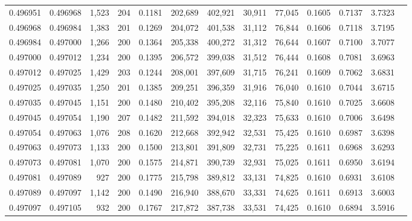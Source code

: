\begin{tabular}{rrrrrrrrrrrrr}
0.496951 & 0.496968 & 1,523 & 204 &                                     0.1181 & 202,689 & 402,921 &  30,911 &  77,045 & 0.1605 & 0.7137 & 3.7323 \\
0.496968 & 0.496984 & 1,383 & 201 &                                     0.1269 & 204,072 & 401,538 &  31,112 &  76,844 & 0.1606 & 0.7118 & 3.7195 \\
0.496984 & 0.497000 & 1,266 & 200 &                                     0.1364 & 205,338 & 400,272 &  31,312 &  76,644 & 0.1607 & 0.7100 & 3.7077 \\
0.497000 & 0.497012 & 1,234 & 200 &                                     0.1395 & 206,572 & 399,038 &  31,512 &  76,444 & 0.1608 & 0.7081 & 3.6963 \\
0.497012 & 0.497025 & 1,429 & 203 &                                     0.1244 & 208,001 & 397,609 &  31,715 &  76,241 & 0.1609 & 0.7062 & 3.6831 \\
0.497025 & 0.497035 & 1,250 & 201 &                                     0.1385 & 209,251 & 396,359 &  31,916 &  76,040 & 0.1610 & 0.7044 & 3.6715 \\
0.497035 & 0.497045 & 1,151 & 200 &                                     0.1480 & 210,402 & 395,208 &  32,116 &  75,840 & 0.1610 & 0.7025 & 3.6608 \\
0.497045 & 0.497054 & 1,190 & 207 &                                     0.1482 & 211,592 & 394,018 &  32,323 &  75,633 & 0.1610 & 0.7006 & 3.6498 \\
0.497054 & 0.497063 & 1,076 & 208 &                                     0.1620 & 212,668 & 392,942 &  32,531 &  75,425 & 0.1610 & 0.6987 & 3.6398 \\
0.497063 & 0.497073 & 1,133 & 200 &                                     0.1500 & 213,801 & 391,809 &  32,731 &  75,225 & 0.1611 & 0.6968 & 3.6293 \\
0.497073 & 0.497081 & 1,070 & 200 &                                     0.1575 & 214,871 & 390,739 &  32,931 &  75,025 & 0.1611 & 0.6950 & 3.6194 \\
0.497081 & 0.497089 &   927 & 200 &                                     0.1775 & 215,798 & 389,812 &  33,131 &  74,825 & 0.1610 & 0.6931 & 3.6108 \\
0.497089 & 0.497097 & 1,142 & 200 &                                     0.1490 & 216,940 & 388,670 &  33,331 &  74,625 & 0.1611 & 0.6913 & 3.6003 \\
0.497097 & 0.497105 &   932 & 200 &                                     0.1767 & 217,872 & 387,738 &  33,531 &  74,425 & 0.1610 & 0.6894 & 3.5916 \\

\end{tabular}
